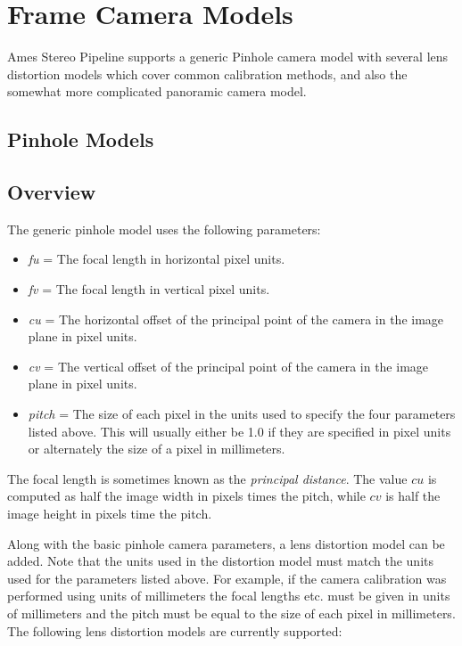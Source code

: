 \chapter{Frame Camera Models}

Ames Stereo Pipeline supports a generic Pinhole camera model with
several lens distortion models which cover common calibration
methods, and also the somewhat more complicated panoramic camera model.

\section{Pinhole Models}
\label{pinholemodels}

\section{Overview}

The generic pinhole model uses the following parameters:

\begin{itemize}{}
\item  \textit{fu} = The focal length in horizontal pixel units.
\item  \textit{fv} = The focal length in vertical pixel units.
\item  \textit{cu} = The horizontal offset of the principal 
point of the camera in the image plane in pixel units.
\item  \textit{cv} = The vertical offset of the principal 
point of the camera in the image plane in pixel units.
\item  \textit{pitch} = The size of each pixel in the units used to specify
the four parameters listed above.  This will usually either be 1.0 if they
are specified in pixel units or alternately the size of a pixel in millimeters.
\end{itemize}

The focal length is sometimes known as the \textit{principal
distance}. The value $cu$ is computed as half the image width in
pixels times the pitch, while $cv$ is half the image height in pixels
time the pitch.


Along with the basic pinhole camera parameters, a lens distortion model
can be added.  Note that the units used in the distortion model must
match the units used for the parameters listed above.  For example, if the
camera calibration was performed using units of millimeters the focal lengths etc. must be given in
units of millimeters and the pitch must be equal to the size of each pixel in millimeters.
The following lens distortion models are currently supported:

